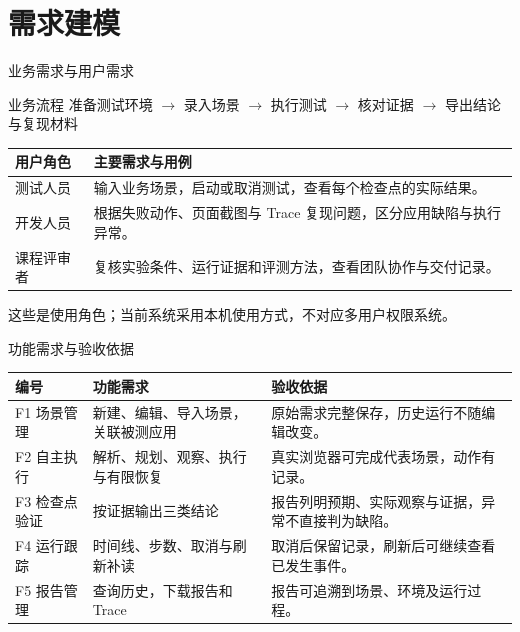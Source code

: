 \section{需求建模}
\begin{frame}{业务需求与用户需求}
\begin{block}{业务流程}
准备测试环境 $\rightarrow$ 录入场景 $\rightarrow$ 执行测试 $\rightarrow$ 核对证据 $\rightarrow$ 导出结论与复现材料
\end{block}
\begin{tabularx}{\textwidth}{lX}
\toprule
用户角色 & 主要需求与用例 \\
\midrule
测试人员 & 输入业务场景，启动或取消测试，查看每个检查点的实际结果。\\
开发人员 & 根据失败动作、页面截图与 Trace 复现问题，区分应用缺陷与执行异常。\\
课程评审者 & 复核实验条件、运行证据和评测方法，查看团队协作与交付记录。\\
\bottomrule
\end{tabularx}
\vfill
\small 这些是使用角色；当前系统采用本机使用方式，不对应多用户权限系统。
\end{frame}

\begin{frame}{功能需求与验收依据}
\small
\begin{tabularx}{\textwidth}{lXX}
\toprule
编号 & 功能需求 & 验收依据 \\
\midrule
F1 场景管理 & 新建、编辑、导入场景，关联被测应用 & 原始需求完整保存，历史运行不随编辑改变。\\
F2 自主执行 & 解析、规划、观察、执行与有限恢复 & 真实浏览器可完成代表场景，动作有记录。\\
F3 检查点验证 & 按证据输出三类结论 & 报告列明预期、实际观察与证据，异常不直接判为缺陷。\\
F4 运行跟踪 & 时间线、步数、取消与刷新补读 & 取消后保留记录，刷新后可继续查看已发生事件。\\
F5 报告管理 & 查询历史，下载报告和 Trace & 报告可追溯到场景、环境及运行过程。\\
\bottomrule
\end{tabularx}
\end{frame}

